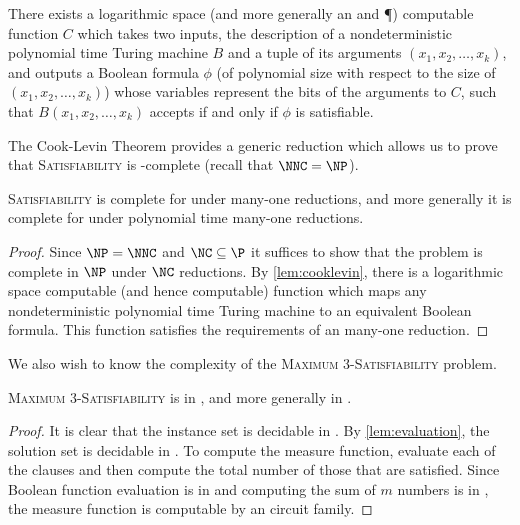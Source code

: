 \documentclass[]{article}
\begin{document}
\begin{lemma}\label{lem:cooklevin}
  There exists a logarithmic space (and more generally an \NC{} and \P) computable function $C$ which takes two inputs, the description of a nondeterministic polynomial time Turing machine $B$ and a tuple of its arguments $(x_1, x_2, \dotsc, x_k)$, and outputs a Boolean formula $\phi$ (of polynomial size with respect to the size of $(x_1, x_2, \dotsc, x_k)$) whose variables represent the bits of the arguments to $C$, such that $B(x_1, x_2, \dotsc, x_k)$ accepts if and only if $\phi$ is satisfiable.
\end{lemma}

The Cook-Levin Theorem provides a generic reduction which allows us to prove that \textsc{Satisfiability} is \NP-complete (recall that $\NNC = \NP$).

\begin{lemma}\label{lem:satisnnccomplete}
  \textsc{Satisfiability} is complete for \NNC{} under \NC{} many-one reductions, and more generally it is complete for \NP{} under polynomial time many-one reductions.
\end{lemma}
\begin{proof}
  Since $\NP = \NNC$ and $\NC \subseteq \P$ it suffices to show that the problem is complete in $\NP$ under $\NC$ reductions.
  By \autoref{lem:cooklevin}, there is a logarithmic space computable (and hence \NC{} computable) function which maps any nondeterministic polynomial time Turing machine to an equivalent Boolean formula.
  This function satisfies the requirements of an \NC{} many-one reduction.
\end{proof}

We also wish to know the complexity of the \textsc{Maximum 3-Satisfiability} problem.

\begin{lemma}\label{lem:maxsatnnco}
  \textsc{Maximum 3-Satisfiability} is in \NNCO, and more generally in \NPO.
\end{lemma}
\begin{proof}
  It is clear that the instance set is decidable in \NC.
  By \autoref{lem:evaluation}, the solution set is decidable in \NC.
  To compute the measure function, evaluate each of the clauses and then compute the total number of those that are satisfied.
  Since Boolean function evaluation is in \NC{} and computing the sum of $m$ numbers is in \NC, the measure function is computable by an \NC{} circuit family.
\end{proof}
\end{document}
